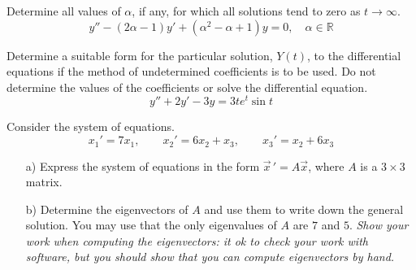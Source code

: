 \documentclass[12pt]{exam}
\begin{document}
    


\newpage


\InitialsRight

\begin{questions}
    

    \question[5] Determine all values of $\alpha$, if any, for which all solutions tend to zero as $t\to\infty$. $$y'' - (2\alpha - 1) y' + (\alpha^2-\alpha+1) y = 0, \quad \alpha \in \mathbb R$$ \vspace{10cm}  %
    
    \question[4]  Determine a suitable form for the particular solution, $Y(t)$, to the differential equations if the method of undetermined coefficients is to be used. Do not determine the values of the coefficients or solve the differential equation.
        $$y'' +2y' - 3y = 3te^t\sin t$$
    
    \newpage    \InitialsLeft
    
        \question[10] Consider the system of equations. 
        $$
        x_1 ' = 7x_1 , \qquad x_2 ' = 6x_2 + x_3 , \qquad x_3 ' = x_2 + 6x_3 
        $$
        \begin{enumerate} 
            \item[a)] Express the system of equations in the form $\vec x \, ' = A \vec x$, where $A$ is a $3\times3$ matrix. \vspace{3cm} 

            \item[b)] Determine the eigenvectors of $A$ and use them to write down the general solution. You may use that the only eigenvalues of $A$ are $7$ and $5$. \textit{Show your work when computing the eigenvectors: it ok to check your work with software, but you should show that you can compute eigenvectors by hand. }
                
        \end{enumerate}
        

    \newpage \InitialsLeft
    

\end{questions}
\end{document}

